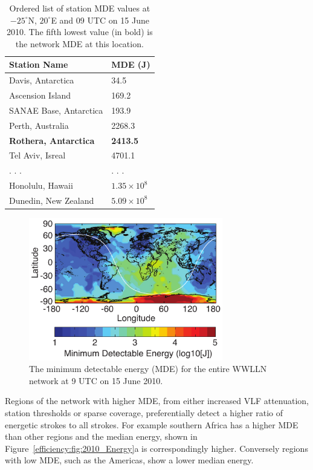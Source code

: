 \begin{table}[ht!]
\caption{Ordered list of station MDE values at $-25^\circ$N, $20^\circ$E and 09 UTC on 15 June 2010.
The fifth lowest value (in bold) is the network MDE at this location.}
\begin{center}
\begin{tabular}{p{2in}p{1in}}
\hline
Station Name 		& 	MDE (J)\\
\hline
\rule{0pt}{3ex}
Davis, Antarctica	&	34.5\\ 
Ascension Island	&	169.2\\ 
SANAE Base, Antarctica	&	193.9\\ 
Perth, Australia	&	2268.3\\ 
{\bf Rothera, Antarctica}	&	{\bf 2413.5}\\ 
Tel Aviv, Isreal	&	4701.1\\ 
. . .	&	. . .\\ 
Honolulu, Hawaii	&	$1.35 \times 10^8$\\ 
Dunedin, New Zealand	&	$5.09 \times 10^8$\\ 
\hline
\end{tabular}
\end{center}
\label{efficiency:table:mdeTable}
\end{table}

\begin{figure}[ht!]
   \centering
\noindent\includegraphics[width=20pc]{efficiency/Figures/2012RS005049-p4.pdf} 
   \caption{The minimum detectable energy (MDE) for the entire WWLLN network at 9 UTC on 15 June 2010.}
   \label{efficiency:fig:Minimum_Energy}
\end{figure}

Regions of the network with higher MDE, from either increased VLF attenuation, station thresholds or sparse coverage, preferentially detect a higher ratio of energetic strokes to all strokes.
For example southern Africa has a higher MDE than other regions and the median energy, shown in Figure~\ref{efficiency:fig:2010_Energy}a is correspondingly higher.
Conversely regions with low MDE, such as the Americas, show a lower median energy.

